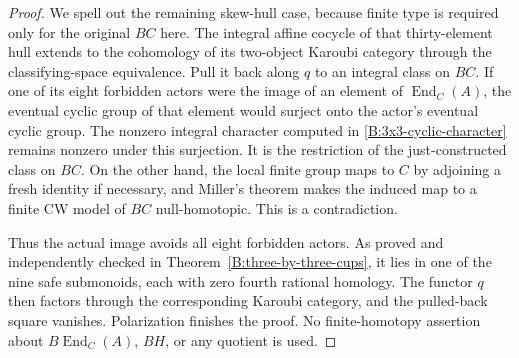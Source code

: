 \begin{proof}
We spell out the remaining skew-hull case, because finite type
is required only for the original $BC$ here.
The integral affine cocycle of that thirty-element hull extends
to the cohomology of its two-object Karoubi category through the
classifying-space equivalence.  Pull it back along $q$ to an
integral class on $BC$.
If one of its eight forbidden actors were the image of an element
of $\operatorname{End}_C(A)$, the eventual cyclic group of that
element would surject onto the actor's eventual cyclic group.
The nonzero integral character computed in
\eqref{B:3x3-cyclic-character} remains nonzero under this
surjection.  It is the restriction of the just-constructed class
on $BC$.  On the other hand, the local finite group maps to $C$
by adjoining a fresh identity if necessary, and Miller's theorem
makes the induced map to a finite CW model of $BC$ null-homotopic.
This is a contradiction.

Thus the actual image avoids all eight forbidden actors.  As
proved and independently checked in
Theorem~\ref{B:three-by-three-cups}, it lies in one of the nine
safe submonoids, each with zero fourth rational homology.  The
functor $q$ then factors through the corresponding Karoubi
category, and the pulled-back square vanishes.  Polarization
finishes the proof.  No finite-homotopy assertion about
$B\operatorname{End}_C(A)$, $BH$, or any quotient is used.
\end{proof}


